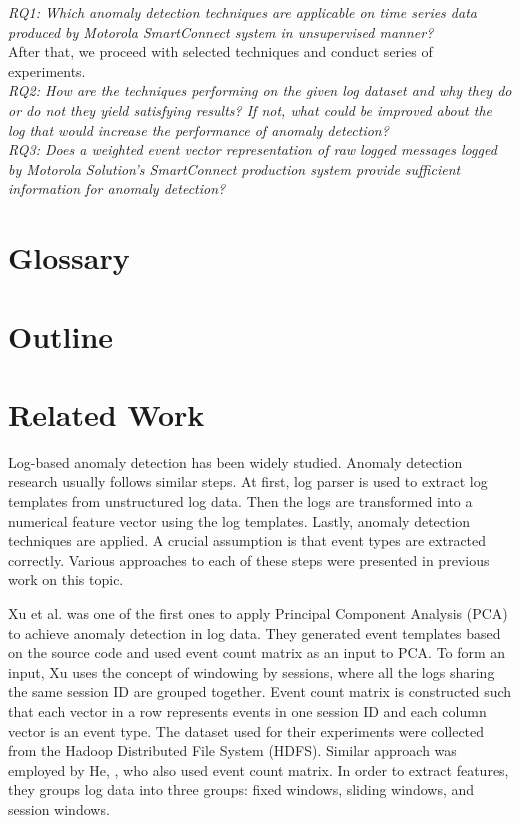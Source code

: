     \textit{RQ1: Which anomaly detection techniques are applicable on time series data produced by Motorola SmartConnect system in unsupervised manner?}\\
    
After that, we proceed with selected techniques and conduct series of experiments.\\

    \textit{RQ2: How are the techniques performing on the given log dataset and why they do or do not they yield satisfying results? If not, what could be improved about the log that would increase the performance of anomaly detection?}\\ 
    
    \textit{RQ3: Does a weighted event vector representation of raw logged messages logged by Motorola Solution's SmartConnect production system provide sufficient information for anomaly detection?}
    
\section{Glossary}

\glsaddall
\printglossaries


\section{Outline}

\section{Related Work}
Log-based anomaly detection has been widely studied. Anomaly detection research usually follows similar steps. At first, log parser is used to extract log templates from unstructured log data. Then the logs are transformed into a numerical feature vector using the log templates. Lastly, anomaly detection techniques are applied. A crucial assumption is that event types are extracted correctly. Various approaches to each of these steps were presented in previous work on this topic. 

Xu et al. \cite{xu2009} was one of the first ones to apply Principal Component Analysis (PCA) to achieve anomaly detection in log data. They generated event templates based on the source code and used event count matrix as an input to PCA. To form an input, Xu uses the concept of windowing by sessions, where all the logs sharing the same session ID are grouped together. Event count matrix is constructed such that each vector in a row represents events in one session ID and each column vector is an event type. The dataset used for their experiments were collected from the Hadoop Distributed File System (HDFS).
Similar approach was employed by He, \cite{he2016}, who also used event count matrix. In order to extract features, they groups log data into three groups: fixed windows, sliding windows, and session windows. 

